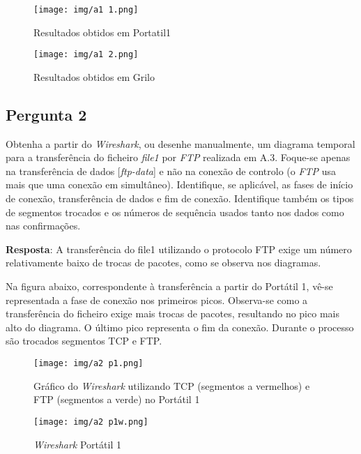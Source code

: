 \documentclass[runningheads]{llncs}
\begin{document}
    \begin{figure}[!ht]
    \centering
    \texttt{[image: img/a1 1.png]}
    \caption{Resultados obtidos em Portatil1} 
    \label{fig:data1}
    \end{figure}
    
    \begin{figure}[!ht]
    \centering
    \texttt{[image: img/a1 2.png]}
    \caption{Resultados obtidos em Grilo} 
    \label{fig:data2}
    \end{figure}
    
    \newpage
    
    \subsection{Pergunta 2}
    Obtenha a partir do \textit{Wireshark}, ou desenhe manualmente, um diagrama temporal para a transferência do ficheiro \textit{file1} por \textit{FTP} realizada em A.3. Foque-se apenas na transferência de dados [\textit{ftp-data}] e não na conexão de controlo (o \textit{FTP} usa mais que uma conexão em simultâneo). Identifique, se aplicável, as fases de início de conexão, transferência de dados e fim de conexão. Identifique também os tipos de segmentos trocados e os números de sequência usados tanto nos dados como nas confirmações.
    
    \bigskip
    
    \textbf{Resposta}: A transferência do file1 utilizando o protocolo FTP exige um número relativamente baixo de trocas de pacotes, como se observa nos diagramas.
    
    Na figura abaixo, correspondente à transferência a partir do Portátil 1, vê-se representada a fase de conexão nos primeiros picos. Observa-se como a transferência do ficheiro exige mais trocas de pacotes, resultando no pico mais alto do diagrama. O último pico representa o fim da conexão. Durante o processo são trocados segmentos TCP e FTP. 
    
    
    \begin{figure}[!ht]
    \centering
    \texttt{[image: img/a2 p1.png]}
    \caption{Gráfico do \textit{Wireshark} utilizando TCP (segmentos a vermelhos) e FTP (segmentos a verde) no Portátil 1} 
    \label{fig:data20}
    \end{figure}
    
    \begin{figure}[!ht]
    \centering
    \texttt{[image: img/a2 p1w.png]}
    \caption{\textit{Wireshark} Portátil 1} 
    \label{fig:data21}
    \end{figure}
    
\end{document}
